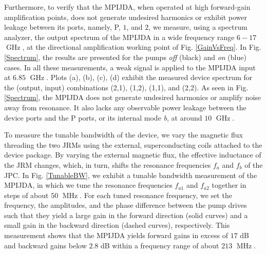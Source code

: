 \documentclass[aip,onecolumn,10pt]{revtex4}%
\begin{document}
Furthermore, to verify that the MPIJDA, when operated at high forward-gain amplification points, does not generate undesired harmonics or exhibit power leakage between its ports, namely, P, $1$, and $2$, we measure, using a spectrum analyzer, the output spectrum of the MPIJDA in a wide frequency range $6-17$ $\operatorname{GHz}$, at the directional amplification working point of Fig. \ref{GainVsFreq}. In Fig. \ref{Spectrum}, the results are presented for the pumps \textit{off} (black) and \textit{on} (blue) cases. In all these measurements, a weak signal is applied to the MPIJDA input at $6.85$ $\operatorname{GHz}$. Plots (a), (b), (c), (d) exhibit the measured device spectrum for the (output, input) combinations (2,1), (1,2), (1,1), and (2,2). As seen in Fig. \ref{Spectrum}, the MPIJDA does not generate undesired harmonics or amplify noise away from resonance. It also lacks any observable power leakage between the device ports and the P ports, or its internal mode \textit{b}, at around $10$ $\operatorname{GHz}$.  

To measure the tunable bandwidth of the device, we vary the magnetic flux threading the two JRMs using the external, superconducting coils attached to the device package. By varying the external magnetic flux, the effective inductance of the JRM changes, which, in turn, shifts the resonance frequencies $f_a$ and $f_b$ of the JPC. In Fig. \ref{TunableBW}, we exhibit a tunable bandwidth measurement of the MPIJDA, in which we tune the resonance frequencies $f_{a1}$ and $f_{a2}$ together in steps of about $50$ $\operatorname{MHz}$. For each tuned resonance frequency, we set the frequency, the amplitudes, and the phase difference between the pump drives such that they yield a large gain in the forward direction (solid curves) and a small gain in the backward direction (dashed curves), respectively. This measurement shows that the MPIJDA yields forward gains in excess of $17$ dB and backward gains below $2.8$ dB within a frequency range of about $213$ $\operatorname{MHz}$.    
\end{document}
